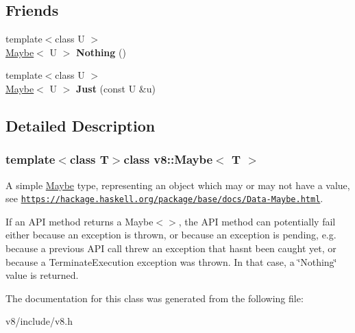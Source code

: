 \subsection*{Friends}
\begin{DoxyCompactItemize}
\item 
\hypertarget{classv8_1_1Maybe_aeb9593e125b42d748acbd69b72c89f37}{}{\footnotesize template$<$class U $>$ }\\\hyperlink{classv8_1_1Maybe}{Maybe}$<$ U $>$ {\bfseries Nothing} ()\label{classv8_1_1Maybe_aeb9593e125b42d748acbd69b72c89f37}

\item 
\hypertarget{classv8_1_1Maybe_aeff0e7fedd63cfebe9a5286e2cd8552d}{}{\footnotesize template$<$class U $>$ }\\\hyperlink{classv8_1_1Maybe}{Maybe}$<$ U $>$ {\bfseries Just} (const U \&u)\label{classv8_1_1Maybe_aeff0e7fedd63cfebe9a5286e2cd8552d}

\end{DoxyCompactItemize}


\subsection{Detailed Description}
\subsubsection*{template$<$class T$>$class v8\+::\+Maybe$<$ T $>$}

A simple \hyperlink{classv8_1_1Maybe}{Maybe} type, representing an object which may or may not have a value, see \href{https://hackage.haskell.org/package/base/docs/Data-Maybe.html}{\tt https\+://hackage.\+haskell.\+org/package/base/docs/\+Data-\/\+Maybe.\+html}.

If an A\+P\+I method returns a Maybe$<$$>$, the A\+P\+I method can potentially fail either because an exception is thrown, or because an exception is pending, e.\+g. because a previous A\+P\+I call threw an exception that hasn\textquotesingle{}t been caught yet, or because a Terminate\+Execution exception was thrown. In that case, a \char`\"{}\+Nothing\char`\"{} value is returned. 

The documentation for this class was generated from the following file\+:\begin{DoxyCompactItemize}
\item 
v8/include/v8.\+h\end{DoxyCompactItemize}
